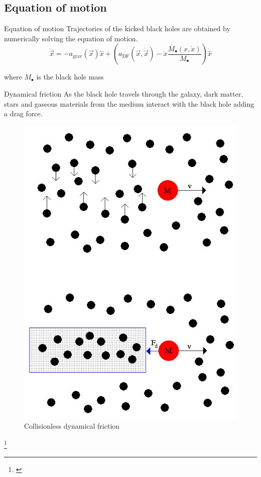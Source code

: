 \documentclass{beamer}
\newcommand\blfootnote[1]
{%
	\begingroup
	\renewcommand\thefootnote{}\footnote{#1}%
	\addtocounter{footnote}{-1}%
	\endgroup
}
\newcommand{\fcite}[1]{\blfootnote{\tiny\cite{#1}}}
\begin{document}
\subsection{Equation of motion}
	\begin{frame}{Equation of motion}
	Trajectories of the kicked black holes are obtained by numerically solving the equation of motion.
	\begin{equation}\label{eq: equationMotion}
		\ddot{\vec{x}} = -a_\text{grav}(\vec{x})\hat{x} + \left(a_\text{DF}(\vec{x}, \dot{\vec{x}})-\dot{x}\dfrac{\dot{M_\bullet}(x, \dot{x})}{M_\bullet}\right)\dot{\hat{x}} 
	\end{equation}
	
	where $M_\bullet$ is the black hole mass
\end{frame}

\begin{frame}{Dynamical friction}
	As the black hole travels through the galaxy, dark matter, stars and gaseous materials from the medium interact with the black hole adding a drag force.
	\begin{figure}[h]
		\centering
		\includegraphics[width = 0.25\linewidth]{images/dyn_friction}
		\caption{Collisionless dynamical friction}
	\end{figure}
	\fcite{df_image}
\end{frame}
\end{document}
